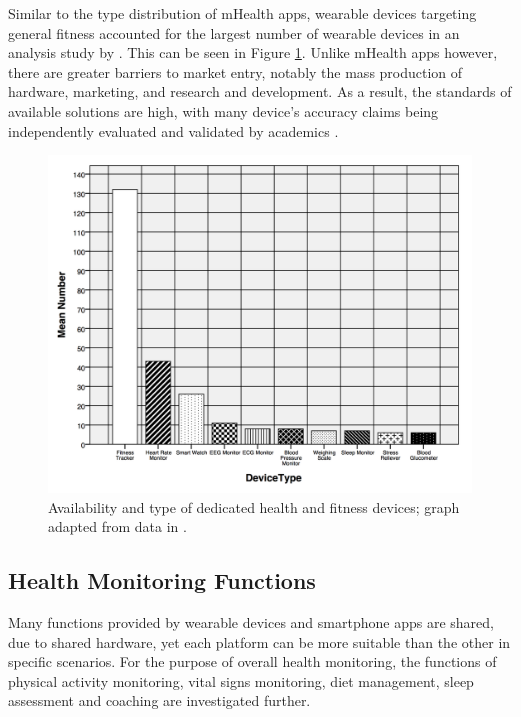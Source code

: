 Similar to the type distribution of mHealth apps, wearable devices targeting general fitness accounted for the largest number of wearable devices in an analysis study by \cite{IMSmHealth2015}. This can be seen in Figure \ref{fig: imshealth-devices}. Unlike mHealth apps however, there are greater barriers to market entry, notably the mass production of hardware, marketing, and research and development. As a result, the standards of available solutions are high, with many device's accuracy claims being independently evaluated and validated by academics \cite{Ferguson2015}.

\begin{figure}[h]
    \centering
    \includegraphics[scale=0.35, angle=0]{Files/literature-review/figures/imshealth-devices}
    \caption{Availability and type of dedicated health and fitness devices; graph adapted from data in \cite{IMSmHealth2015}.}
    \label{fig: imshealth-devices}
\end{figure}

\subsection{Health Monitoring Functions}
Many functions provided by wearable devices and smartphone apps are shared, due to shared hardware, yet each platform can be more suitable than the other in specific scenarios. For the purpose of overall health monitoring, the functions of physical activity monitoring, vital signs monitoring, diet management, sleep assessment and coaching are investigated further.

